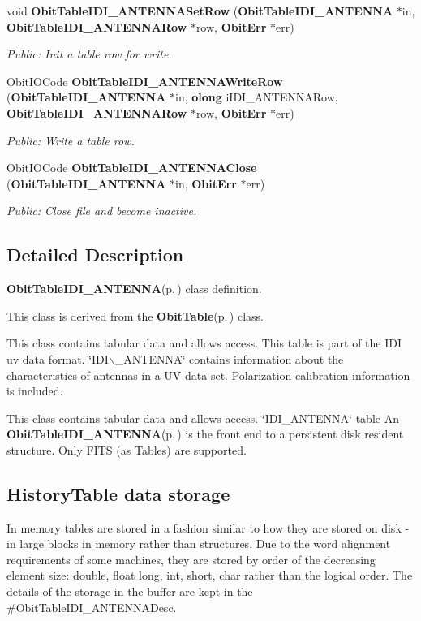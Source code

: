 \begin{CompactItemize}
void {\bf Obit\-Table\-IDI\_\-ANTENNASet\-Row} ({\bf Obit\-Table\-IDI\_\-ANTENNA} $\ast$in, {\bf Obit\-Table\-IDI\_\-ANTENNARow} $\ast$row, {\bf Obit\-Err} $\ast$err)
\begin{CompactList}\small\item\em Public: Init a table row for write. \item\end{CompactList}\item 
Obit\-IOCode {\bf Obit\-Table\-IDI\_\-ANTENNAWrite\-Row} ({\bf Obit\-Table\-IDI\_\-ANTENNA} $\ast$in, {\bf olong} i\-IDI\_\-ANTENNARow, {\bf Obit\-Table\-IDI\_\-ANTENNARow} $\ast$row, {\bf Obit\-Err} $\ast$err)
\begin{CompactList}\small\item\em Public: Write a table row. \item\end{CompactList}\item 
Obit\-IOCode {\bf Obit\-Table\-IDI\_\-ANTENNAClose} ({\bf Obit\-Table\-IDI\_\-ANTENNA} $\ast$in, {\bf Obit\-Err} $\ast$err)
\begin{CompactList}\small\item\em Public: Close file and become inactive. \item\end{CompactList}\end{CompactItemize}


\subsection{Detailed Description}
{\bf Obit\-Table\-IDI\_\-ANTENNA}{\rm (p.\,\pageref{structObitTableIDI__ANTENNA})} class definition. 

This class is derived from the {\bf Obit\-Table}{\rm (p.\,\pageref{structObitTable})} class.

This class contains tabular data and allows access. This table is part of the IDI uv data format. \char`\"{}IDI$\backslash$\_\-ANTENNA\char`\"{} contains information about the characteristics of antennas in a UV data set. Polarization calibration information is included.

This class contains tabular data and allows access. \char`\"{}IDI\_\-ANTENNA\char`\"{} table An {\bf Obit\-Table\-IDI\_\-ANTENNA}{\rm (p.\,\pageref{structObitTableIDI__ANTENNA})} is the front end to a persistent disk resident structure. Only FITS (as Tables) are supported.\subsection{History\-Table data storage}\label{ObitTableWX_8h_TableDataStorage}
In memory tables are stored in a fashion similar to how they are stored on disk - in large blocks in memory rather than structures. Due to the word alignment requirements of some machines, they are stored by order of the decreasing element size: double, float long, int, short, char rather than the logical order. The details of the storage in the buffer are kept in the \#Obit\-Table\-IDI\_\-ANTENNADesc.

